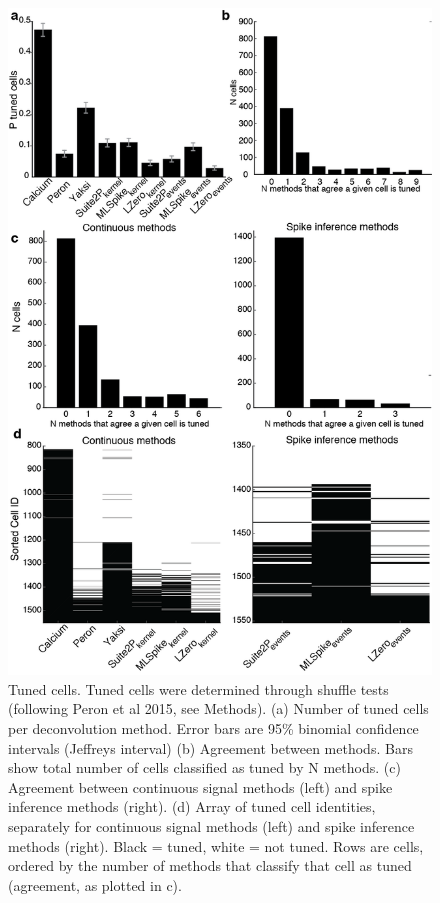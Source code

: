 \documentclass[a4paper,10pt,twocolumn]{article}
\begin{document}
\begin{figure}
\includegraphics[trim={0 0 0 0},clip,width=\textwidth]{full_figs/why_deconvolve_F4_3.png}
\caption{\label{fig:tuned_cells} Tuned cells. Tuned cells were determined through shuffle tests (following Peron et al 2015, see Methods).  (a) Number of tuned cells per deconvolution method. Error bars are 95\% binomial confidence intervals (Jeffreys interval) (b) Agreement between methods. Bars show total number of cells classified as tuned by N methods. (c) Agreement between continuous signal methods (left) and spike inference methods (right). (d) Array of tuned cell identities, separately for continuous signal methods (left) and spike inference methods (right). Black = tuned, white = not tuned. Rows are cells, ordered by the number of methods that classify that cell as tuned (agreement, as plotted in c).}
\end{figure}
\end{document}
